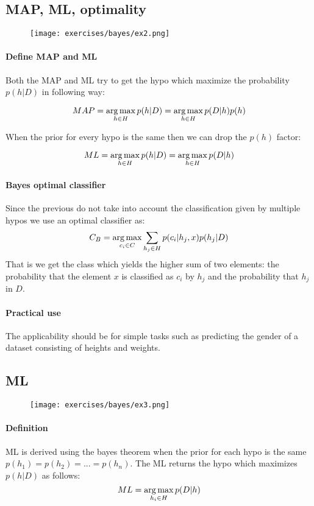 \subsection{MAP, ML, optimality}
\begin{figure}[H]
    \centering
   \texttt{[image: exercises/bayes/ex2.png]}
\end{figure}

\paragraph{Define MAP and ML }
Both the MAP and ML try to get the hypo which maximize the probability $p(h|D)$ in following way:

$$MAP=\operatorname*{arg\,max}_{h \in H} p(h|D)=\operatorname*{arg\,max}_{h \in H} p(D|h)p(h)$$

When the prior for every hypo is the same then we can drop the $p(h)$ factor:

$$ML=\operatorname*{arg\,max}_{h \in H} p(h|D)=\operatorname*{arg\,max}_{h \in H} p(D|h)$$

\paragraph{Bayes optimal classifier}
Since the previous do not take into account the classification given by multiple hypos we use an optimal classifier as:
$$C_{B}=\operatorname*{arg\,max}_{c_i \in C}\sum_{h_j \in H} p(c_i| h_j,x)p(h_j|D)$$
That is we get the class which yields the higher sum of two elements: the probability that the element $x$ is classified as $c_i$ by $h_j$ and the probability that $h_j$ in $D$.

\paragraph{Practical use}
The applicability should be for simple tasks such as predicting the gender of a dataset consisting of heights and weights.


\subsection{ML}
\begin{figure}[H]
    \centering
   \texttt{[image: exercises/bayes/ex3.png]}
\end{figure}

\paragraph{Definition}
ML is derived using the bayes theorem when the prior for each hypo is the same $p(h_1)=p(h_2)=...=p(h_n)$.
The ML returns the hypo which maximizes $p(h|D)$ as follows:
$$ML=\operatorname*{arg\,max}_{h_i \in H}p(D|h)$$

